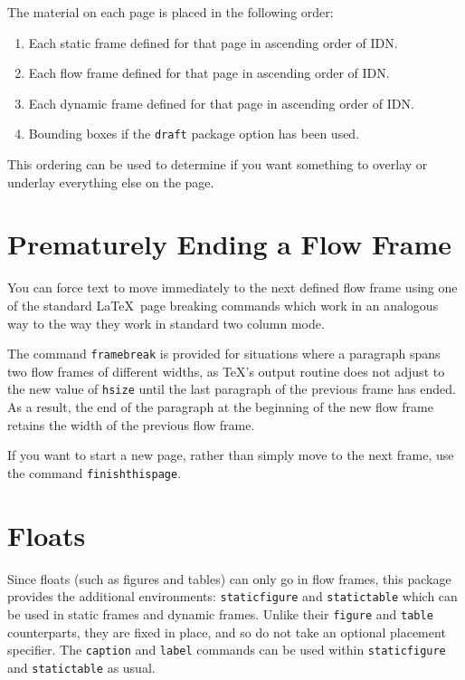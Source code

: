 \documentclass[a4paper]{report}
\newcommand{\env}[1]{\texttt{#1}}
\newcommand{\cmdname}[1]{\texttt{\symbol{92}#1}}
\begin{document}
The material on each page is placed in the following order:
\begin{enumerate}
\item Each static frame defined for that page in ascending
order of IDN.

\item Each flow frame defined for that page in ascending
order of IDN.

\item Each dynamic frame defined for that page in ascending
order of IDN.

\item {Bounding boxes} if the \texttt{draft}
package option has been used.
\end{enumerate}

This ordering can be used to determine if you want something
to overlay or underlay everything else on the page. 

\section*{Prematurely Ending a Flow Frame}

You can force text to move immediately to the next defined
flow frame using one of the standard \LaTeX\ page breaking commands
which  work in an analogous way to the way they
work in standard two column mode. 

The command \cmdname{framebreak} is provided for situations
where a paragraph spans two flow frames
of different widths, as \TeX's output routine does not 
adjust to the new value of \cmdname{hsize} until the last 
paragraph of the previous frame has ended. As a 
result, the end of the paragraph at the beginning of the new
flow frame retains the width of the previous flow frame.

If you want to start a new page, rather than simply move to the 
next frame, use the command\newline
\cmdname{finishthispage}.

\section*{Floats}

Since floats (such as figures and tables) can only go in 
{flow frames}, this package provides
the additional environments: 
\env{staticfigure} and  
\env{statictable} which can be used in static frames
and dynamic frames. Unlike their \env{figure} and
\env{table} counterparts, they are fixed in place, and
so do not take an optional placement specifier. The 
\cmdname{caption} and \cmdname{label} commands can 
be used within \env{staticfigure} and \env{statictable} as
usual.
\end{document}
